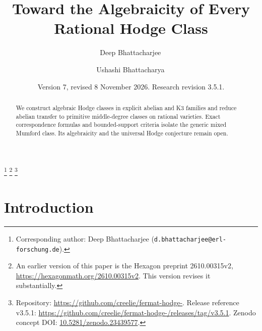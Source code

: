 \documentclass[11pt,reqno]{amsart}
\numberwithin{equation}{section}
\theoremstyle{plain}
\theoremstyle{definition}
\newcommand{\codeRelease}{https://github.com/creelie/fermat-hodge-/releases/tag/v3.5.1}
\newcommand{\archiveDOI}{10.5281/zenodo.23439577}
\newcommand{\archiveLabel}{Zenodo concept DOI}
\begin{document}

\title[Toward algebraicity of Hodge classes]{Toward the Algebraicity of Every Rational Hodge Class}

\author{Deep Bhattacharjee\,}
\address{Formerly, Electro-Gravitational Space Propulsion Laboratory (EGSPL), Bhubaneswar, Odisha 751030, India; Formerly, University of Calcutta (Heramba Chandra College), 23/49 Gariahat Road, Golpark, Kolkata 700029, West Bengal, India}
\thanks{Corresponding author: Deep Bhattacharjee (\nolinkurl{d.bhattacharjee@erl-forschung.de}).}
\thanks{An earlier version of this paper is the Hexagon preprint 2610.00315v2, \url{https://hexagonmath.org/2610.00315v2}. This version revises it substantially.}
\thanks{Repository: \url{https://github.com/creelie/fermat-hodge-}. Release reference v3.5.1: \url{\codeRelease}. \archiveLabel: \href{https://doi.org/\archiveDOI}{\archiveDOI}.}

\author{Ushashi Bhattacharya\,}
\address{Formerly, National Taiwan University, Taipei 106319, Taiwan}

\date{Version 7, revised 8 November 2026. Research revision 3.5.1.}


\begin{abstract}
We construct algebraic Hodge classes in explicit abelian and K3 families and reduce abelian transfer to primitive middle-degree classes on rational varieties. Exact correspondence formulas and bounded-support criteria isolate the generic mixed Mumford class. Its algebraicity and the universal Hodge conjecture remain open.
\end{abstract}

\maketitle
\enlargethispage{8pt}
\setcounter{tocdepth}{1}
\tableofcontents

\section{Introduction}\label{sec:intro}
\end{document}
